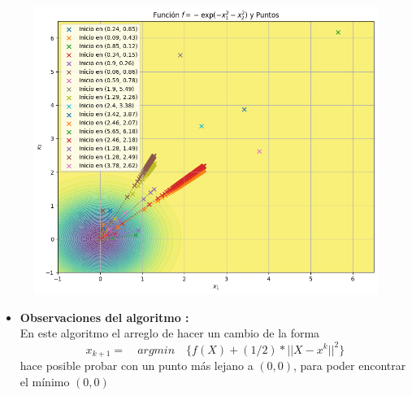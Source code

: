 \begin{itemize}
\begin{figure}
    \centering
    \includegraphics[width=0.65\linewidth]{figuras/PREG8_ARMIJO.png}
    \label{fig:enter-label}
\end{figure}

\begin{itemize}
    \item \textbf{Observaciones del algoritmo :}\\
    En este algoritmo el arreglo de hacer un cambio de la forma \[ x_{k+1} = \quad  arg min \quad \{ f(X)+(1/2) *||X-x^k||^2 \} \] hace posible probar con un punto más lejano a $(0,0)$, para poder encontrar el mínimo $(0,0)$
\end{itemize}
\end{itemize}



